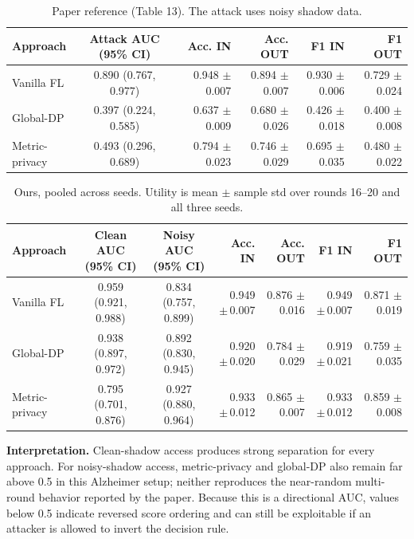 \documentclass[10pt]{article}
\begin{document}
\begin{table}[h]
\centering
\caption{Paper reference (Table 13). The attack uses noisy shadow data.}
\begin{tabular}{lccrrrr}
\toprule
Approach & Attack AUC (95\% CI) & & Acc. IN & Acc. OUT & F1 IN & F1 OUT \\
\midrule
Vanilla FL & 0.890 (0.767, 0.977) & & 0.948 $\pm$ 0.007 & 0.894 $\pm$ 0.007 & 0.930 $\pm$ 0.006 & 0.729 $\pm$ 0.024 \\
Global-DP & 0.397 (0.224, 0.585) & & 0.637 $\pm$ 0.009 & 0.680 $\pm$ 0.026 & 0.426 $\pm$ 0.018 & 0.400 $\pm$ 0.008 \\
Metric-privacy & 0.493 (0.296, 0.689) & & 0.794 $\pm$ 0.023 & 0.746 $\pm$ 0.029 & 0.695 $\pm$ 0.035 & 0.480 $\pm$ 0.022 \\
\bottomrule
\end{tabular}
\end{table}

\begin{table}[h]
\centering
\caption{Ours, pooled across seeds. Utility is mean $\pm$ sample std over rounds 16--20 and all three seeds.}
\begin{tabular}{lccrrrr}
\toprule
Approach & Clean AUC (95\% CI) & Noisy AUC (95\% CI) & Acc. IN & Acc. OUT & F1 IN & F1 OUT \\
\midrule
Vanilla FL & 0.959 (0.921, 0.988) & 0.834 (0.757, 0.899) & 0.949 {\scriptsize$\pm$\,0.007} & 0.876 {\scriptsize$\pm$\,0.016} & 0.949 {\scriptsize$\pm$\,0.007} & 0.871 {\scriptsize$\pm$\,0.019} \\
Global-DP & 0.938 (0.897, 0.972) & 0.892 (0.830, 0.945) & 0.920 {\scriptsize$\pm$\,0.020} & 0.784 {\scriptsize$\pm$\,0.029} & 0.919 {\scriptsize$\pm$\,0.021} & 0.759 {\scriptsize$\pm$\,0.035} \\
Metric-privacy & 0.795 (0.701, 0.876) & 0.927 (0.880, 0.964) & 0.933 {\scriptsize$\pm$\,0.012} & 0.865 {\scriptsize$\pm$\,0.007} & 0.933 {\scriptsize$\pm$\,0.012} & 0.859 {\scriptsize$\pm$\,0.008} \\
\bottomrule
\end{tabular}
\end{table}

\textbf{Interpretation.} Clean-shadow access produces strong separation for every approach.
For noisy-shadow access, metric-privacy and global-DP also remain far above 0.5 in this Alzheimer setup;
neither reproduces the near-random multi-round behavior reported by the paper. Because this is a directional
AUC, values below 0.5 indicate reversed score ordering and can still be exploitable if an attacker is allowed
to invert the decision rule.
\end{document}
